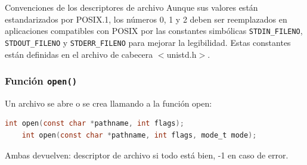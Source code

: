 \documentclass{article}
\begin{document}
\begin{summary}{Convenciones de los descriptores de archivo}
    Aunque sus valores están estandarizados por POSIX.1, los números 0, 1 y 2 deben ser reemplazados en aplicaciones compatibles con POSIX por las constantes simbólicas \texttt{STDIN\_FILENO}, \texttt{STDOUT\_FILENO} y \texttt{STDERR\_FILENO} para mejorar la legibilidad. Estas constantes están definidas en el archivo de cabecera $<$unistd.h$>$.
\end{summary}

\subsubsection{Función \texttt{open()}}
Un archivo se abre o se crea llamando a la función open:
\begin{lstlisting}[language=C]
    int open(const char *pathname, int flags);
    int open(const char *pathname, int flags, mode_t mode);
\end{lstlisting}
Ambas devuelven: descriptor de archivo si todo está bien, -1 en caso de error.
\end{document}
